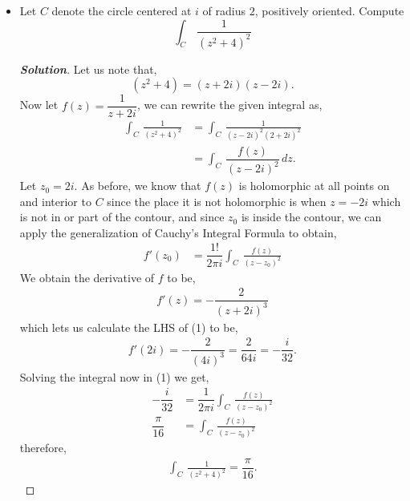 \documentclass[11pt]{article}
\newenvironment{problem}[2][Problem\!]{\begin{trivlist}
\item[\hskip \labelsep {\bfseries #1}\hskip \labelsep {\bfseries #2}]}{\end{trivlist}}
\newenvironment{solution}{\begin{proof}[\textbf{\textit{Solution}}] }{\end{proof}}
\begin{document}
\begin{problem}{8.1}
\begin{itemize}[itemsep=3em]
\item[(b)] Let $C$ denote the circle centered at $i$ of radius $2$, positively oriented. Compute
\[\int_C\,\frac{1}{(z^2 + 4)^2}\]
\begin{solution}
    Let us note that,
    \[(z^{2} + 4) = (z + 2i)(z - 2i).\]
    Now let $f(z) = \dfrac{1}{z + 2 i }$, we can rewrite the given integral as,
    \begin{align*}
        \int_C\,\frac{1}{(z^2 + 4)^2} &= \int_C\,\frac{1}{(z- 2 i)^{2} (2 +2 i)^{2}} \\
        &= \int_C\,\dfrac{f(z)}{(z - 2i)^{2}}\, d z .
    \end{align*}
    Let $z_0 = 2i$. As before, we know that $f(z)$ is holomorphic at all points on and interior to $C$ since the place it is not holomorphic is when $z = -2i$ which is not in or part of the contour, and since $z_0$ is inside the contour, we can apply the generalization of Cauchy's Integral Formula to obtain,
    \begin{align}
        f'(z_0) &= \dfrac{1!}{2\pi i }\int_C\, \frac{f(z)}{(z - z_0)^{2}} 
    \end{align} 
    We obtain the derivative of $f$ to be,
    \begin{align*}
        f'(z) = -\dfrac{2}{(z + 2 i )^{3}}
    \end{align*}
    which lets us calculate the LHS of (1) to be,
    \begin{align*}
        f'(2i) = -\dfrac{2}{(4i)^{3}} = \dfrac{2}{64 i} = -\dfrac{i}{32}.
    \end{align*} 
    Solving the integral now in (1) we get,
    \begin{align*}
        -\dfrac{i}{32} &= \dfrac{1}{2\pi i}\int_C\, \frac{f(z)}{(z - z_0)^{2}} \\
        \dfrac{ \pi }{16} &= \int_C\, \frac{f(z)}{(z - z_0)^{2}}
    \end{align*}
    therefore,
    \begin{align*}
        \int_C\,\frac{1}{(z^2 + 4)^2} = \dfrac{\pi}{16}.
    \end{align*}
\end{solution}

\end{itemize}
\end{problem}

\newpage  %
\end{document}
